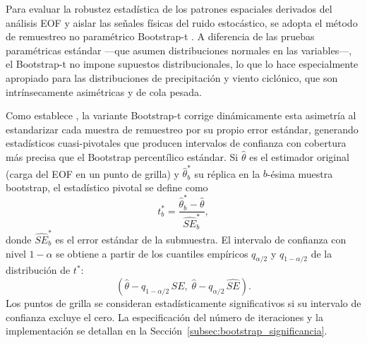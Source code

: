 Para evaluar la robustez estadística de los patrones espaciales derivados del análisis EOF y aislar las señales físicas del ruido estocástico, se adopta el método de remuestreo no paramétrico Bootstrap-t \citep{efron1993introduction}. 
A diferencia de las pruebas paramétricas estándar —que asumen distribuciones normales en las variables—, el Bootstrap-t no impone supuestos distribucionales, lo que lo hace especialmente apropiado para las distribuciones de precipitación y viento ciclónico, que son intrínsecamente asimétricas y de cola pesada.

Como establece \citet{hesterberg2015bootstrap}, la variante Bootstrap-t corrige dinámicamente esta asimetría al estandarizar cada muestra de remuestreo por su propio error estándar, generando estadísticos cuasi-pivotales que producen intervalos de confianza con cobertura más precisa que el Bootstrap percentílico estándar. 
Si $\hat{\theta}$ es el estimador original (carga del EOF en un punto de grilla) y $\hat{\theta}^*_b$ su réplica en la $b$-ésima muestra bootstrap, el estadístico pivotal se define como
\begin{equation}\label{eq:bootstrap_t}
t^*_b = \frac{\hat{\theta}^*_b - \hat{\theta}}{\widehat{SE}^*_b},
\end{equation}
donde $\widehat{SE}^*_b$ es el error estándar de la submuestra. El intervalo de confianza con nivel $1-\alpha$ se obtiene a partir de los cuantiles empíricos $q_{\alpha/2}$ y $q_{1-\alpha/2}$ de la distribución de $t^*$:
\begin{equation}\label{eq:bootstrap_ci}
\left(\hat{\theta} - q_{1-\alpha/2}\,\widehat{SE},\; \hat{\theta} - q_{\alpha/2}\,\widehat{SE}\right).
\end{equation}
Los puntos de grilla se consideran estadísticamente significativos si su intervalo de confianza excluye el cero. La especificación del número de iteraciones y la implementación se detallan en la Sección~\ref{subsec:bootstrap_significancia}.